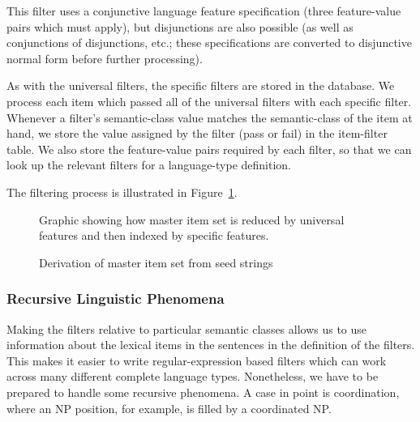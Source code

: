 \documentclass[11pt]{article}
\begin{document}
%
This filter uses a conjunctive language feature specification
(three feature-value pairs which must apply), but disjunctions are
also possible (as well as conjunctions of disjunctions, etc.; these
specifications are converted to disjunctive normal form before
further processing).

As with the universal filters, the specific filters are stored in the
database.  We process each item which passed all of the universal
filters with each specific filter.  Whenever a filter's semantic-class
value matches the semantic-class of the item at hand, we store the
value assigned by the filter (pass or fail) in the item-filter table.
We also store the feature-value pairs required by each filter, so that
we can look up the relevant filters for a language-type definition.

The filtering process is illustrated in Figure~\ref{shrinking-sets}.

\begin{figure}[ht]
\begin{center}

Graphic showing how master item set is reduced by universal features
and then indexed by specific features.

\end{center}
\caption{Derivation of master item set from seed strings}
\label{shrinking-sets}
\end{figure}


\subsubsection{Recursive Linguistic Phenomena}

Making the filters relative to particular semantic classes
allows us to use information about the lexical items in 
the sentences in the definition of the filters.  This makes
it easier to write regular-expression based filters which
can work across many different complete language types. Nonetheless,
we have to be prepared to handle some recursive phenomena.
A case in point is coordination, where an NP position, for example,
is filled by a coordinated NP.  
\end{document}
